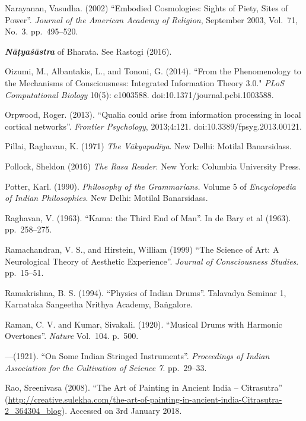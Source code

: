 \begin{thebibliography}{99}
Narayanan, Vasudha. (2002) “Embodied Cosmologies: Sights of Piety, Sites of Power”. \textsl{Journal of the American Academy of Religion}, September 2003, Vol.~71, No.~3. pp.~495--520.

{\sl\bfseries Nāṭyaśāstra} of Bharata. See Rastogi (2016).

Oizumi, M., Albantakis, L., and Tononi, G. (2014). ``From the Phenomenology to the Mechanisms of Consciousness: Integrated Information Theory 3.0." \textsl{PLoS Computational Biology} 10(5): e1003588. doi:10.1371/journal.pcbi.1003588. 

Orpwood, Roger. (2013). “Qualia could arise from information processing in local cortical networks”. \textsl{Frontier Psychology}, 2013;4:121. doi:10.3389/fpsyg.2013.00121.

Pillai, Raghavan, K. (1971) \textsl{The Vākyapadīya}. New Delhi: Motilal Banarsidass.

Pollock, Sheldon (2016) \textsl{The Rasa Reader}. New York: Columbia University Press.

Potter, Karl. (1990). \textsl{Philosophy of the Grammarians.} Volume 5 of \textsl{Encyclopedia of Indian Philosophies}. New Delhi: Motilal Banarsidass.

Raghavan, V. (1963). “Kama: the Third End of Man”. In de Bary et al (1963). pp.~258--275.

Ramachandran, V. S., and Hirstein, William (1999) “The Science of Art: A Neurological Theory of Aesthetic Experience”. \textsl{Journal of Consciousness Studies}. pp.~15--51.

Ramakrishna, B. S. (1994). “Physics of Indian Drums”. Talavadya Seminar 1, Karnataka Sangeetha Nrithya Academy, Baṅgalore.

Raman, C. V. and Kumar, Sivakali. (1920). “Musical Drums with Harmonic Overtones”. \textsl{Nature} Vol.~104. p.~500.

---\kern3pt(1921). “On Some Indian Stringed Instruments”. \textsl{Proceedings of Indian Association for the Cultivation of Science 7}. pp.~29--33.

Rao, Sreenivasa (2008). “The Art of Painting in Ancient India -- Citrasutra” (\url{http://creative.sulekha.com/the-art-of-painting-in-ancient-india-Citrasutra-2_364304_blog}). Accessed on 3rd January 2018.


\end{thebibliography}
